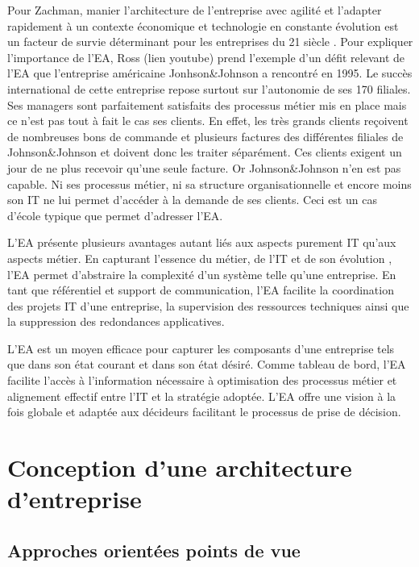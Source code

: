 Pour Zachman, manier l'architecture de l'entreprise avec agilité et l'adapter rapidement à un contexte économique et technologie en constante évolution est un facteur de survie déterminant pour les entreprises du 21 siècle \cite{zachman1997enterprise}. Pour expliquer l'importance de l'EA, Ross (lien youtube) prend l'exemple d'un défit relevant de l'EA que l'entreprise américaine Jonhson\&Johnson a rencontré en 1995. Le succès international de cette entreprise repose surtout sur l'autonomie de ses 170 filiales. Ses managers sont parfaitement satisfaits des processus métier mis en place mais ce n'est pas tout à fait le cas ses clients. En effet, les très grands clients reçoivent de nombreuses bons de commande et plusieurs factures des différentes filiales de Johnson\&Johnson et doivent donc les traiter séparément. Ces clients exigent un jour de ne plus recevoir qu'une seule facture. Or Johnson\&Johnson n'en est pas capable. Ni ses processus métier, ni sa structure organisationnelle et encore moins son IT ne lui permet d'accéder à la demande de ses clients. Ceci est un cas d'école typique que permet d'adresser l'EA.

L'EA présente plusieurs avantages autant liés aux aspects purement IT qu'aux aspects métier. En capturant l'essence du métier, de l'IT et de son évolution \cite{lankhorst2013enterprise}, l'EA permet d'abstraire la complexité d'un système telle qu'une entreprise. En tant que référentiel et support de communication, l'EA facilite la coordination des projets IT d'une entreprise, la supervision des ressources techniques ainsi que la suppression des redondances applicatives\cite{shah2007frameworks}.

L'EA est un moyen efficace pour capturer les composants d'une entreprise tels que dans son état courant et dans son état désiré. Comme tableau de bord, l'EA facilite l'accès à l'information nécessaire à optimisation des processus métier et alignement effectif entre l'IT et la stratégie adoptée. L'EA offre une vision à la fois globale et adaptée aux décideurs facilitant le processus de prise de décision. 

\section{Conception d'une architecture d'entreprise}

	\subsection{Approches orientées points de vue}

